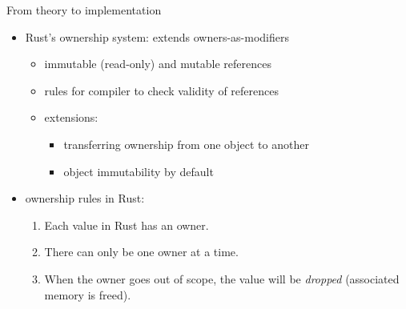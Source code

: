\documentclass[handout]{beamer}
\begin{document}
\begin{frame}{From theory to implementation}
\begin{itemize}
  \item Rust's ownership system: extends owners-as-modifiers
  \begin{itemize}
    \item immutable (read-only) and mutable references %
    \item rules for compiler to check validity of references
    \item extensions:
    \begin{itemize}
      \item transferring ownership from one object to another
      \item object immutability by default
    \end{itemize}
  \end{itemize}
  \item ownership rules in Rust:
  \begin{enumerate}
    \item Each value in Rust has an owner.
    \item There can only be one owner at a time.
    \item When the owner goes out of scope, the value will be \emph{dropped} (associated memory is freed).
  \end{enumerate}
\end{itemize}
\end{frame}



\end{document}
